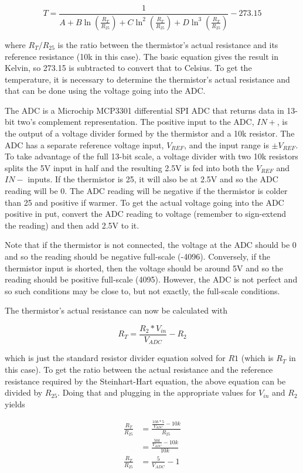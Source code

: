 \documentclass{article}
\begin{document}
\[
T = \frac{1}{A + B\ln(\frac{R_T}{R_{25}}) + C\ln^2(\frac{R_T}{R_{25}}) + D\ln^3(\frac{R_T}{R_{25}})}
- 273.15
\]

where $R_T/R_{25}$ is the ratio between the thermistor's actual resistance and its reference
resistance (10k\textOmega{} in this case).  The basic equation gives the result in Kelvin, so 273.15
is subtracted to convert that to Celsius.  To get the temperature, it is necessary to determine the
thermistor's actual resistance and that can be done using the voltage going into the ADC.

The ADC is a Microchip MCP3301 differential SPI ADC that returns data in 13-bit two's complement
representation.  The positive input to the ADC, $IN+$, is the output of a voltage divider formed by
the thermistor and a 10k\textOmega{} resistor.  The ADC has a separate reference voltage input,
$V_{REF}$, and the input range is $\pm V_{REF}$.  To take advantage of the full 13-bit scale, a
voltage divider with two 10k\textOmega{} resistors splits the 5V input in half and the resulting
2.5V is fed into both the $V_{REF}$ and $IN-$ inputs.  If the thermistor is 25\textcelsius{}, it
will also be at 2.5V and so the ADC reading will be 0.  The ADC reading will be negative if the
thermistor is colder than 25\textcelsius{} and positive if warmer.  To get the actual voltage going
into the ADC positive in put, convert the ADC reading to voltage (remember to sign-extend the
reading) and then add 2.5V to it.

Note that if the thermistor is not connected, the voltage at the ADC should be 0 and so the reading
should be negative full-scale (-4096).  Conversely, if the thermistor input is shorted, then the
voltage should be around 5V and so the reading should be positive full-scale (4095).  However, the
ADC is not perfect and so such conditions may be close to, but not exactly, the full-scale
conditions.

The thermistor's actual resistance can now be calculated with

\[
R_T = \frac{R_2*V_{in}}{V_{ADC}} - R_2
\]

which is just the standard resistor divider equation solved for $R1$ (which is $R_T$ in this case).
To get the ratio between the actual resistance and the reference resistance required by the 
Steinhart-Hart equation, the above equation can be divided by $R_{25}$.  Doing that and plugging in
the appropriate values for $V_{in}$ and $R_2$ yields

\begin{align*}
    \frac{R_T}{R_{25}} &= \frac{\frac{10k * 5}{V_{ADC}} - 10k}{R_{25}} \\
    &= \frac{\frac{50k}{V_{ADC}} - 10k}{10k} \\
    \frac{R_T}{R_{25}} &= \frac{5}{V_{ADC}} - 1
\end{align*}
\end{document}
